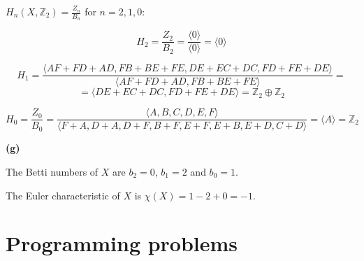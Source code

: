 \documentclass[12pt]{article}
\begin{document}
		$H_n(X,\mathbb{Z}_2)=\frac{Z_n}{B_n}$ for $n=2,1,0$:
		
		$$H_2=\frac{Z_2}{B_2}=\frac{\langle 0 \rangle}{\langle 0 \rangle}=\langle 0 \rangle$$
		
		$$H_1=\frac{\langle AF + FD + AD, FB + BE + FE, DE + EC + DC,
			FD + FE + DE  \rangle}{\langle AF + FD + AD, FB + BE + FE \rangle} = $$
		$$  = \langle DE + EC + DC, FD + FE + DE \rangle = \mathbb{Z}_2 \oplus \mathbb{Z}_2$$
		
		$$H_0=\frac{Z_0}{B_0}=\frac{\langle A, B, C, D, E, F \rangle}{\langle F+A,D+A,D+F,B+F,E+F,E+B,E+D,C+D \rangle}= \langle A \rangle = \mathbb{Z}_2$$	
		
		\textbf{(g)} 
		
		The Betti numbers of $X$ are $b_2=0$, $b_1=2$ and $b_0=1$.
		
		The Euler characteristic of $X$ is $\chi(X)=1-2+0=-1$.
		
		\section{Programming problems}
	
	
	
	
	
	
	
	
	
\end{document}
